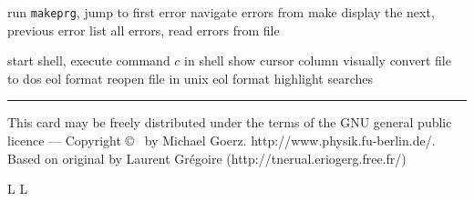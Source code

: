  {run {\tt makeprg}, jump to first error}
 {navigate errors from make}
 {display the next, previous error}
 {list all errors, read errors from file}


 {start shell, execute command $c$ in shell}
 {show cursor column visually}
 {convert file to dos eol format} 
 {reopen file in unix eol format}
 {highlight searches}


\vfill \hrule\smallskip
{\smallrm This card may be freely distributed under
the terms of the GNU general public licence ---
Copyright \copyright\ {} by Michael Goerz. 
{\smalltt http://www.physik.fu-berlin.de/}. Based on original by 
Laurent Gr\'egoire  ({\smalltt http://tnerual.eriogerg.free.fr/})}

\supereject
\if L\lr \else\null\vfill\eject\fi
\if L\lr \else\null\vfill\eject\fi
\bye

